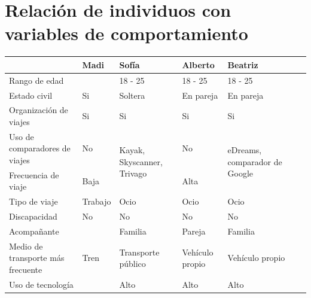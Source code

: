 \section{Relación de individuos con variables de comportamiento}
\begin{table}[H]
    \centering
    \begin{tabular}{l|l|l|l|l|l|l|}
        \cline{2-5}
                                                                & Madi        & Sofía                          & Alberto            & Beatriz                         \\ \hline
        \multicolumn{1}{|l|}{Rango de edad}                     &             & 18 - 25                        & 18 - 25            & 18 - 25                         \\ \hline
        \multicolumn{1}{|l|}{Estado civil}                      & Si          & Soltera                        & En pareja          & En pareja                       \\ \hline
        \multicolumn{1}{|l|}{Organización de viajes}            & Si          & Si                             & Si                 & Si                              \\ \hline
        \multicolumn{1}{|l|}{Uso de comparadores de viajes}     & No          & \multirow{2}{*}{Kayak, Skyscanner, Trivago}     & No                 & \multirow{2}{*}{eDreams, comparador de Google}   \\ \hline
        \multicolumn{1}{|l|}{Frecuencia de viaje}               & Baja        & Media                          & Alta               & Baja                            \\ \hline
        \multicolumn{1}{|l|}{Tipo de viaje}                     & Trabajo     & Ocio                           & Ocio               & Ocio                            \\ \hline
        \multicolumn{1}{|l|}{Discapacidad}                      & No          & No                             & No                 & No                              \\ \hline
        \multicolumn{1}{|l|}{Acompañante}                       &             & Familia                        & Pareja             & Familia                         \\ \hline
        \multicolumn{1}{|l|}{Medio de transporte más frecuente} & Tren        & Transporte público             & Vehículo propio    & Vehículo propio                 \\ \hline
        \multicolumn{1}{|l|}{Uso de tecnología}                 &             & Alto                           & Alto               & Alto                            \\ \hline

\end{tabular}
\end{table}
